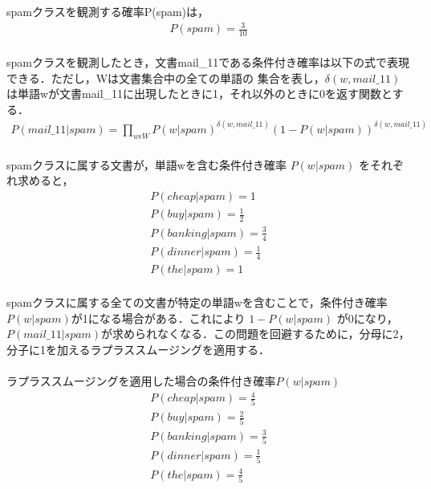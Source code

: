 \documentclass[dvipdfmx,autodetect-engine,titlepage]{jsarticle}
\begin{document}

spamクラスを観測する確率P(spam)は，
\begin{eqnarray*}
  P(spam) = \frac{3}{10} \\
\end{eqnarray*}

spamクラスを観測したとき，文書mail\_11である条件付き確率は以下の式で表現できる．ただし，Wは文書集合中の全ての単語の
集合を表し，\begin{math}
  \delta(w,mail\_11)
\end{math}
は単語wが文書mail\_11に出現したときに1，それ以外のときに0を返す関数とする．
\begin{eqnarray*}
  P(mail\_11| spam) = \prod_{w\epsilon W} P(w| spam)^{\delta(w,mail\_11)} (1-P(w|spam))^{\delta(w,mail\_11)} \\
\end{eqnarray*}

spamクラスに属する文書が，単語wを含む条件付き確率
\begin{math}
  P(w|spam)
\end{math}
をそれぞれ求めると，
\begin{eqnarray*}
  P(cheap|spam) = 1 \\
  P(buy|spam) = \frac{1}{2}  \\
  P(banking|spam) = \frac{3}{4}  \\
  P(dinner|spam) = \frac{1}{4}  \\
  P(the|spam) = 1  \\
\end{eqnarray*}

spamクラスに属する全ての文書が特定の単語wを含むことで，条件付き確率
\begin{math}
  P(w|spam)
\end{math}が1になる場合がある．これにより
\begin{math}
  1-P(w|spam) 
\end{math}
が0になり，\begin{math}
  P(mail\_11|spam)
\end{math}が求められなくなる．この問題を回避するために，分母に2，分子に1を加えるラプラススムージングを適用する．\\\\
ラプラススムージングを適用した場合の条件付き確率\begin{math}
  P(w|spam)
\end{math}
\begin{eqnarray*}
  P(cheap|spam) = \frac{4}{5} \\
  P(buy|spam) = \frac{2}{5}  \\
  P(banking|spam) = \frac{3}{5}  \\
  P(dinner|spam) =  \frac{1}{5} \\
  P(the|spam) = \frac{4}{5} \\
\end{eqnarray*}
\end{document}
